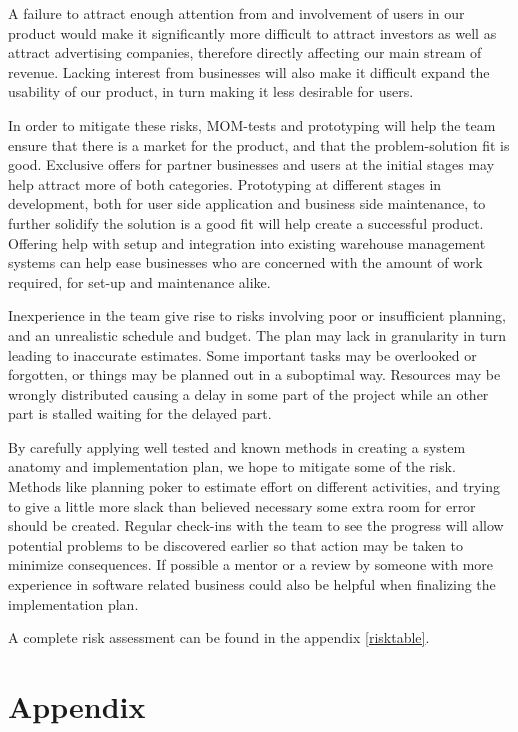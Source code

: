 \documentclass[titlepage]{article}
\begin{document}
A failure to attract enough attention from and involvement of users in our product would make it significantly more difficult to attract investors as well as attract advertising companies, therefore directly affecting our main stream of revenue. Lacking interest from businesses will also make it difficult expand the usability of our product, in turn making it less desirable for users.

In order to mitigate these risks, MOM-tests and prototyping will help the team ensure that there is a market for the product, and that the problem-solution fit is good. Exclusive offers for partner businesses and users at the initial stages may help attract more of both categories. Prototyping at different stages in development, both for user side application and business side maintenance, to further solidify the solution is a good fit will help create a successful product. Offering help with setup and integration into existing warehouse management systems can help ease businesses who are concerned with the amount of work required, for set-up and maintenance alike. 

Inexperience in the team give rise to risks involving poor or insufficient planning, and an unrealistic schedule and budget. The plan may lack in granularity in turn leading to inaccurate estimates. Some important tasks may be overlooked or forgotten, or things may be planned out in a suboptimal way. Resources may be wrongly distributed causing a delay in some part of the project while an other part is stalled waiting for the delayed part.

By carefully applying well tested and known methods in creating a system anatomy and implementation plan, we hope to mitigate some of the risk. Methods like planning poker to estimate effort on different activities, and trying to give a little more slack than believed necessary some extra room for error should be created. Regular check-ins with the team to see the progress will allow potential problems to be discovered earlier so that action may be taken to minimize consequences. If possible a mentor or a review by someone with more experience in software related business could also be helpful when finalizing the implementation plan.

A complete risk assessment can be found in the appendix \ref{risktable}.

\section{Appendix}
\end{document}
